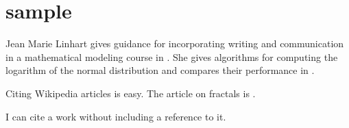 \section*{sample}
 
Jean Marie Linhart gives guidance for incorporating writing and communication in a mathematical modeling course in \cite{Linhart2014}.  She gives algorithms for computing the logarithm of the normal distribution and compares their performance in \cite{Linhart2008}.

Citing Wikipedia articles is easy.  The article on fractals is \cite{fractalwiki}.

I can cite a work without including a reference to it.  \nocite{higham1998handbook}

 
